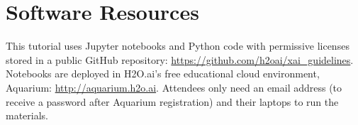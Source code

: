 \documentclass[sigconf]{acmart}
\begin{document}
\section*{Software Resources}

This tutorial uses Jupyter notebooks and Python code with permissive licenses stored in a public GitHub repository: \url{https://github.com/h2oai/xai_guidelines}. Notebooks are deployed in H2O.ai's free educational cloud environment, Aquarium: \url{http://aquarium.h2o.ai}. Attendees only need an email address (to receive a password after Aquarium registration) and their laptops to run the materials.\\



\end{document}
